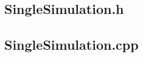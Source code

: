 \documentclass{article}
\begin{document}
		\subsection{SingleSimulation.h}
		
		\subsection{SingleSimulation.cpp}
		
%		
%		
\end{document}

